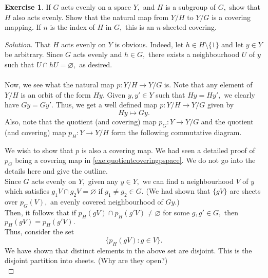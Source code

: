 \documentclass[12pt]{article}
\theoremstyle{definition}
\numberwithin{thm}{section}
\newtheorem{exe}[thm]{Exercise}
\let\emptyset\varnothing
\newenvironment{soln}{\begin{proof}[Solution]}{\end{proof}}
\begin{document}
\begin{exe}
	If $G$ acts evenly on a space $Y,$ and $H$ is a subgroup of $G,$ show that $H$ also acts evenly. Show that the natural map from $Y/H$ to $Y/G$ is a covering mapping. If $n$ is the index of $H$ in $G,$ this is an $n$-sheeted covering. 
\end{exe}
\begin{soln}
	That $H$ acts evenly on $Y$ is obvious. Indeed, let $h \in H\setminus\{1\}$ and let $y \in Y$ be arbitrary. Since $G$ acts evenly and $h \in G,$ there exists a neighbourhood $U$ of $y$ such that $U \cap hU = \emptyset,$ as desired.\\~\\
	Now, we see what the natural map $p:Y/H \to Y/G$ is. Note that any element of $Y/H$ is an orbit of the form $Hy.$ Given $y, y' \in Y$ such that $Hy = Hy',$ we clearly have $Gy = Gy'.$ Thus, we get a well defined map $p:Y/H \to Y/G$ given by
	\begin{equation*} 
		Hy \mapsto Gy.
	\end{equation*}
	Also, note that the quotient (and covering) map $p_G:Y \to Y/G$ and the quotient (and covering) map $p_H: Y \to Y/H$ form the following commutative diagram.
	\begin{center}
	\end{center}
	We wish to show that $p$ is also a covering map. We had seen a detailed proof of $p_G$ being a covering map in \cref{exe:quotientcoveringpspace}. We do not go into the details here and give the outline.\\
	Since $G$ acts evenly on $Y,$ given any $y \in Y,$ we can find a neighbourhood $V$ of $y$ which satisfies $g_1V \cap g_2V = \emptyset$ if $g_1 \neq g_2 \in G.$ (We had shown that $\{gV\}$ are sheets over $p_G(V),$ an evenly covered neighbourhood of $Gy.$)  \\
	Then, it follows that if $p_H(gV) \cap p_H(g'V) \neq \emptyset$ for some $g, g' \in G,$ then $p_H(gV) = p_H(g'V).$\\
	Thus, consider the set
	\begin{equation*} 
		\{p_H(gV) : g \in V\}.
	\end{equation*}
	We have shown that distinct elements in the above set are disjoint. This is the disjoint partition into sheets. (Why are they open?)\\

\end{soln}
\end{document}
